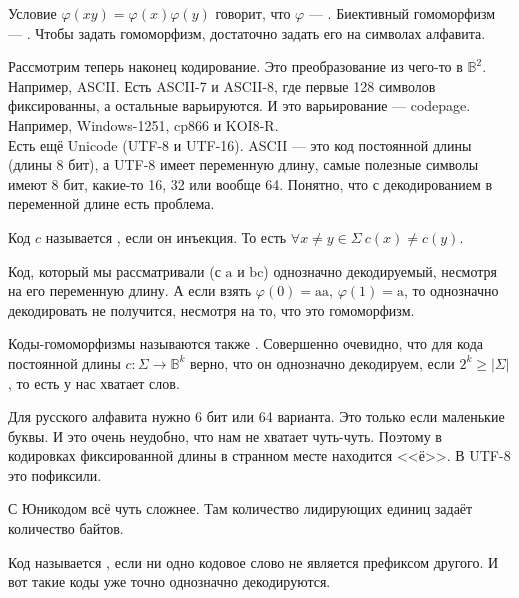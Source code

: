 \documentclass{article}
\begin{document}
\begin{itemize}
\begin{Example}
        \end{Example}
        \dfn Условие $\varphi(xy)=\varphi(x)\varphi(y)$ говорит, что $\varphi$ --- .
        \dfn Биективный гомоморфизм --- .
        \thm Чтобы задать гомоморфизм, достаточно задать его на символах алфавита.
        \begin{Example}
            Рассмотрим теперь наконец кодирование. Это преобразование из чего-то в $\mathbb B^2$. Например, ASCII. Есть ASCII-7 и ASCII-8, где первые 128 символов фиксированны, а остальные варьируются. И это варьирование --- codepage. Например, Windows-1251, cp866 и KOI8-R.\\
            Есть ещё Unicode (UTF-8 и UTF-16). ASCII --- это код постоянной длины (длины 8 бит), а UTF-8 имеет переменную длину, самые полезные символы имеют 8 бит, какие-то 16, 32 или вообще 64. Понятно, что с декодированием в переменной длине есть проблема.
        \end{Example}
        \dfn Код $c$ называется , если он инъекция. То есть $\forall x\neq y\in\Sigma~c(x)\neq c(y)$.
        \begin{Example}
            Код, который мы рассматривали (с $\mathrm a$ и $\mathrm b\mathrm c$) однозначно декодируемый, несмотря на его переменную длину. А если взять $\varphi(0)=\mathrm{aa}$, $\varphi(1)=\mathrm a$, то однозначно декодировать не получится, несмотря на то, что это гомоморфизм.
        \end{Example}
        \dfn Коды-гомоморфизмы называются также .
        \thm Совершенно очевидно, что для кода постоянной длины $c\colon\Sigma\to\mathbb B^k$ верно, что он однозначно декодируем, если $2^k\geqslant|\Sigma|$, то есть у нас хватает слов.
        \begin{Example}
            Для русского алфавита нужно 6 бит или 64 варианта. Это только если маленькие буквы. И это очень неудобно, что нам не хватает чуть-чуть. Поэтому в кодировках фиксированной длины в странном месте находится <<ё>>. В UTF-8 это пофиксили.
        \end{Example}
        \begin{Example}
            С Юникодом всё чуть сложнее. Там количество лидирующих единиц задаёт количество байтов.
        \end{Example}
        \dfn Код называется , если ни одно кодовое слово не является префиксом другого.
        \thm И вот такие коды уже точно однозначно декодируются.

\end{itemize}
\end{document}
